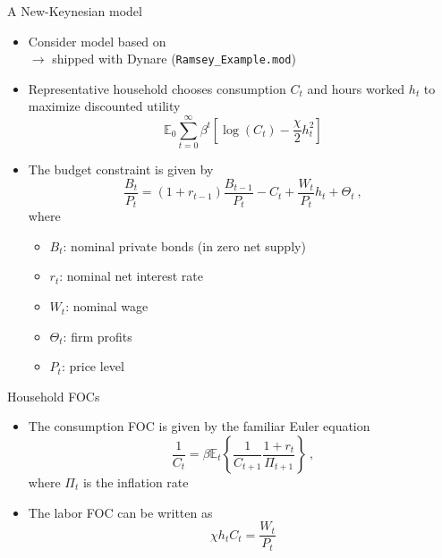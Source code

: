 \documentclass[handout,usepdftitle=false,xcolor=dvipsnames,aspectratio=169]{beamer}
\begin{document}
\begin{frame}{A New-Keynesian model}
  \begin{itemize}
    \item Consider model based on \textcite{CMR2007} \\
    $\rightarrow$ shipped with Dynare (\texttt{Ramsey\_Example.mod})
    \item Representative household chooses consumption $C_t$ and hours worked $h_t$ to maximize discounted utility
          \begin{equation}
            \mathbb{E}_0 \sum_{t=0}^\infty\beta^{t} \left[ \log \left( C_t \right) -\frac{\chi}{2} h_{t}^2\right]
          \end{equation}
    \item The budget constraint is given by
          \begin{equation}
            \frac{B_{t}}{P_t} =
            (1+r_{t-1})\frac{B_{t-1}}{P_t}-C_{t}+\frac{W_t}{P_t}h_{t} +\Theta_{t} \: ,
          \end{equation}
          where
          \begin{itemize}
            \item $B_t$: nominal private bonds (in zero net supply)
            \item $r_t$: nominal net interest rate
            \item $W_t$: nominal wage
            \item $\Theta_t$: firm profits
            \item $P_t$: price level
          \end{itemize}
  \end{itemize}
\end{frame}

\begin{frame}{Household FOCs}
  \begin{itemize}
    \item The consumption FOC is given by the familiar Euler equation
          \begin{equation}
            \frac{1}{C_{t}} =\beta \mathbb{E}_{t}\left \{\frac{1}{C_{t+1}}\frac{1+r_{t}}{\Pi_{t+1}}\right \} \: ,                                                                        \end{equation}
          where $\Pi_t$ is the inflation rate
    \item The labor FOC can be written as
          \begin{equation}\label{eq:labor}
            \chi h_tC_t=\frac{W_t}{P_t}
          \end{equation}
  \end{itemize}
\end{frame}
\end{document}
